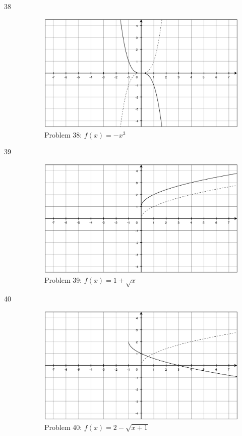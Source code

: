 \documentclass{exam}
\begin{document}
\begin{description}
    \item[38]
      \begin{figure}[H]
        \centering
        \includegraphics[scale=.3]{problem_38.eps}
        \caption*{Problem 38: $f(x) = -x^3$}
      \end{figure}

    \item[39]
      \begin{figure}[H]
        \centering
        \includegraphics[scale=.3]{problem_39.eps}
        \caption*{Problem 39: $f(x) = 1 + \sqrt{x}$}
      \end{figure}

    \item[40]
      \begin{figure}[H]
        \centering
        \includegraphics[scale=.3]{problem_40.eps}
        \caption*{Problem 40:  $f(x) = 2 - \sqrt{x + 1}$ }
      \end{figure}


\end{description}
\end{document}
